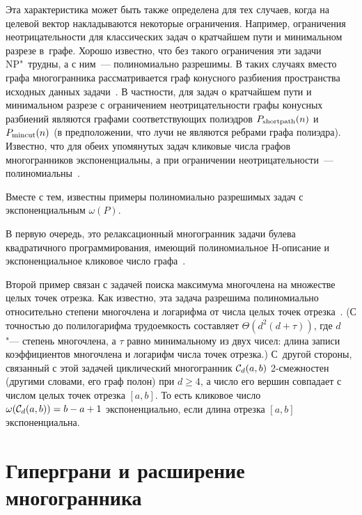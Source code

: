 Эта характеристика может быть также определена для тех случаев,
когда на целевой вектор накладываются некоторые ограничения.
Например, ограничения неотрицательности для классических задач о кратчайшем пути и минимальном разрезе в~графе.
Хорошо известно, что без такого ограничения эти задачи NP"~трудны, а с ним~--- полиномиально разрешимы.
В таких случаях вместо графа многогранника рассматривается граф конусного разбиения пространства исходных данных задачи~\cite{Maksimenko:2004}.
В частности, для задач о кратчайшем пути и минимальном разрезе с ограничением неотрицательности графы конусных разбиений являются графами соответствующих полиэдров $P_{\textup{shortpath}}(n)$ и $P_{\textup{mincut}}(n)$ (в предположении, что лучи не являются ребрами графа полиэдра).
Известно, что для обеих упомянутых задач кликовые числа графов многогранников экспоненциальны, а при ограничении неотрицательности~--- полиномиальны~\cite{Maksimenko:2004, Nikolaev:2016}.

Вместе с тем, известны примеры полиномиально разрешимых задач с экспоненциальным $\omega(P)$.

В первую очередь, это релаксационный многогранник задачи булева квадратичного программирования, имеющий полиномиальное H-описание и экспоненциальное кликовое число графа~\cite{Bondarenko:1987, Padberg:1989}.

Второй пример связан с задачей поиска максимума многочлена на множестве целых точек отрезка.
Как известно, эта задача разрешима полиномиально относительно степени многочлена и логарифма от числа целых точек отрезка~\cite{Pan:2002, Sagraloff:2016}. (С точностью до полилогарифма трудоемкость составляет $\Theta(d^2(d + \tau))$, где $d$ "--- степень многочлена, а $\tau$ равно минимальному из двух чисел: длина записи коэффициентов многочлена и логарифм числа точек отрезка.)
С~другой стороны, связанный с этой задачей циклический многогранник ${\mathcal C}_d(a,b)$ 2-смежностен (другими словами, его граф полон) при $d\ge 4$, а число его вершин совпадает с числом целых точек отрезка $[a,b]$.
То есть кликовое число $\omega({\mathcal C}_d(a,b)) = b-a+1$ экспоненциально, если длина отрезка $[a, b]$ экспоненциальна.



%
%

\section{Гиперграни и расширение многогранника}
\label{sec:ExtensionsAndRC}

